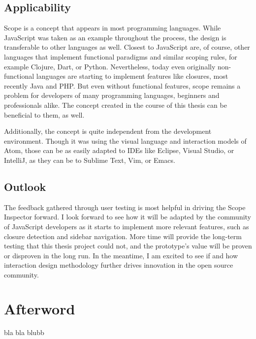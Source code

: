\section{Applicability}\label{applicability}

Scope is a concept that appears in most programming languages. While
JavaScript was taken as an example throughout the process, the design is
transferable to other languages as well. Closest to JavaScript are, of
course, other languages that implement functional paradigms and similar
scoping rules, for example Clojure, Dart, or Python. Nevertheless, today
even originally non-functional languages are starting to implement
features like closures, most recently Java and PHP. But even without
functional features, scope remains a problem for developers of many
programming languages, beginners and professionals alike. The concept
created in the course of this thesis can be beneficial to them, as well.

Additionally, the concept is quite independent from the development
environment. Though it was using the visual language and interaction
models of Atom, those can be as easily adapted to IDEs like Eclipse,
Visual Studio, or IntelliJ, as they can be to Sublime Text, Vim, or
Emacs.

\section{Outlook}\label{outlook}

The feedback gathered through user testing is most helpful in driving
the Scope Inspector forward. I look forward to see how it will be
adapted by the community of JavaScript developers as it starts to
implement more relevant features, such as closure detection and sidebar
navigation. More time will provide the long-term testing that this
thesis project could not, and the prototype’s value will be proven or
disproven in the long run. In the meantime, I am excited to see if and
how interaction design methodology further drives innovation in the open
source community.

\chapter{Afterword}\label{afterword}

bla bla blubb
